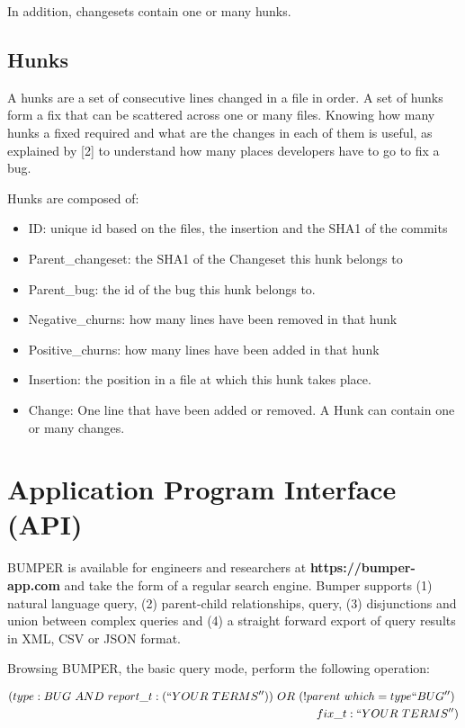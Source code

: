 In addition, changesets contain one or many hunks.

\subsection{Hunks}
A hunks are a set of consecutive lines changed in a file in order. A set of hunks form a fix that can be scattered across one or many files. Knowing how many hunks a fixed required and what are the changes in each of them is useful, as explained by [2] to understand how many places developers have to go to fix a bug.

Hunks are composed of:

\begin{itemize}
\item ID: unique id based on the files, the insertion and the SHA1 of the commits
\item Parent\_changeset: the SHA1 of the Changeset this hunk belongs to
\item Parent\_bug: the id of the bug this hunk belongs to.
\item Negative\_churns: how many lines have been removed in that hunk
\item Positive\_churns: how many lines have been added in that hunk
\item Insertion: the position in a file at which this hunk takes place.
\item Change: One line that have been added or removed. A Hunk can contain one or many changes.
\end{itemize}

\section{Application Program Interface (API)\label{sec:bumper-api}}

BUMPER is available for engineers and researchers at {\bf https://bumper-app.com} and take the form of a regular search engine. Bumper supports (1) natural language query, (2) parent-child relationships, query, (3) disjunctions and union between complex queries and (4) a straight forward export of query results in XML, CSV or JSON format.

Browsing BUMPER, the basic query mode, perform the following operation:

\begin{equation}
\begin{split}
(type:BUG~AND~report\_t:(``YOUR~TERMS''))~OR~(!parent~which=type``BUG'')~\\fix\_t:``YOUR~TERMS'')
\end{split}
\end{equation}

